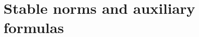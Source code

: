 \documentclass[11pt]{amsart}
\theoremstyle{remark}
\theoremstyle{definition}
\begin{document}

	\section{{Stable norms and auxiliary formulas}}
\end{document}
